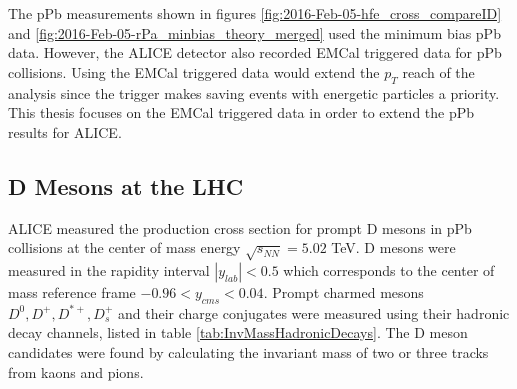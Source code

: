 %


The pPb measurements shown in figures \ref{fig:2016-Feb-05-hfe_cross_compareID} and \ref{fig:2016-Feb-05-rPa_minbias_theory_merged} used the minimum bias pPb data. However, the ALICE detector also recorded EMCal triggered data for pPb collisions. Using the EMCal triggered data would extend the $p_{T}$ reach of the analysis since the trigger makes saving events with energetic particles a priority. This thesis focuses on the EMCal triggered data in order to extend the pPb results for ALICE. 



\subsection{D Mesons at the LHC}

ALICE measured the production cross section for prompt D mesons \cite{Abelev:2014hha} in pPb collisions at the center of mass energy $\sqrt{s_{NN}} = 5.02$ TeV. D mesons were measured in the rapidity interval $|y_{lab}|<0.5$ which corresponds to the center of mass reference frame $-0.96 < y_{cms} < 0.04$. Prompt charmed mesons $D^{0}, D^{+}, D^{\ast +}, D^{+}_{s}$ and their charge conjugates were measured using their hadronic decay channels, listed in table \ref{tab:InvMassHadronicDecays}. The D meson candidates were found by calculating the invariant mass of two or three tracks from kaons and pions. 


